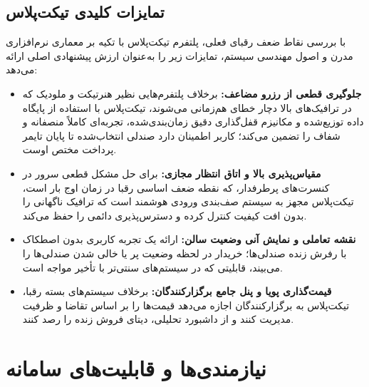 \documentclass[12pt,a4paper]{article}
\begin{document}
\subsection{تمایزات کلیدی تیکت‌پلاس}
با بررسی نقاط ضعف رقبای فعلی، پلتفرم تیکت‌پلاس با تکیه بر معماری نرم‌افزاری
مدرن و اصول مهندسی سیستم، تمایزات زیر را به‌عنوان ارزش پیشنهادی اصلی ارائه
می‌دهد:

\begin{itemize}
  \item \textbf{جلوگیری قطعی از رزرو مضاعف:} برخلاف پلتفرم‌هایی نظیر
  هنرتیکت و ملودیک که در ترافیک‌های بالا دچار خطای هم‌زمانی می‌شوند،
  تیکت‌پلاس با استفاده از پایگاه داده توزیع‌شده و مکانیزم قفل‌گذاری دقیق
  زمان‌بندی‌شده، تجربه‌ای کاملاً منصفانه و شفاف را تضمین می‌کند؛ کاربر
  اطمینان دارد صندلی انتخاب‌شده تا پایان تایمر پرداخت مختص اوست.
  \item \textbf{مقیاس‌پذیری بالا و اتاق انتظار مجازی:} برای حل مشکل قطعی
  سرور در کنسرت‌های پرطرفدار، که نقطه ضعف اساسی رقبا در زمان اوج بار است،
  تیکت‌پلاس مجهز به سیستم صف‌بندی ورودی هوشمند است که ترافیک ناگهانی را بدون
  افت کیفیت کنترل کرده و دسترس‌پذیری دائمی را حفظ می‌کند.
  \item \textbf{نقشه تعاملی و نمایش آنی وضعیت سالن:} ارائه یک تجربه کاربری
  بدون اصطکاک با رفرش زنده صندلی‌ها؛ خریدار در لحظه وضعیت پر یا خالی شدن
  صندلی‌ها را می‌بیند، قابلیتی که در سیستم‌های سنتی‌تر با تأخیر مواجه است.
  \item \textbf{قیمت‌گذاری پویا و پنل جامع برگزارکنندگان:} برخلاف سیستم‌های
  بسته رقبا، تیکت‌پلاس به برگزارکنندگان اجازه می‌دهد قیمت‌ها را بر اساس
  تقاضا و ظرفیت مدیریت کنند و از داشبورد تحلیلی، دیتای فروش زنده را رصد کنند.
\end{itemize}

\section{نیازمندی‌ها و قابلیت‌های سامانه}
\end{document}
